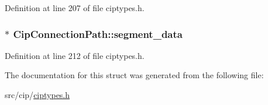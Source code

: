 \-Definition at line 207 of file ciptypes.\-h.

\hypertarget{structCipConnectionPath_a36d55ac33899e7eb25067a83ffdfaba1}{
\subsubsection[{segment\-\_\-data}]{$\ast$ {\bf \-Cip\-Connection\-Path\-::segment\-\_\-data}}}\label{dd/d06/structCipConnectionPath_a36d55ac33899e7eb25067a83ffdfaba1}


\-Definition at line 212 of file ciptypes.\-h.



\-The documentation for this struct was generated from the following file\-:\begin{DoxyCompactItemize}
\item 
src/cip/\hyperlink{ciptypes_8h}{ciptypes.\-h}\end{DoxyCompactItemize}
